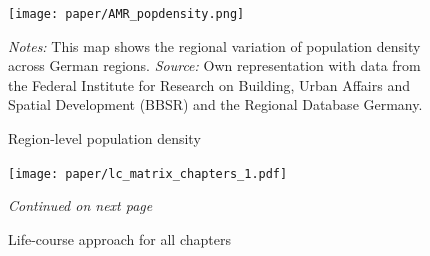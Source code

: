 \documentclass[11pt, a4paper,draft]{article} %
\begin{document}
\vspace*{\fill}
\begin{figure}[H]\centering
	\caption{Region-level population density}\label{fig: AMR_regions_population_density}
	\texttt{[image: paper/AMR\_popdensity.png]}
	\scriptsize
	\begin{minipage}{0.9\linewidth}
		\emph{Notes:} This map shows the regional variation of population density across German regions. \newline\emph{Source:} Own representation with data from the Federal Institute for Research on Building, Urban Affairs and Spatial Development (BBSR) and the Regional Database Germany.
	\end{minipage}
\end{figure}
\vspace*{\fill}\clearpage


\begin{figure}[H]\centering
	\caption{Life-course approach for all chapters}\label{fig: appendix_lc_matrix_chapters}
	\texttt{[image: paper/lc\_matrix\_chapters\_1.pdf]}
		\scriptsize
		\begin{minipage}{\linewidth}
			\emph{Continued on next page}
		\end{minipage}
\end{figure}
\end{document}
